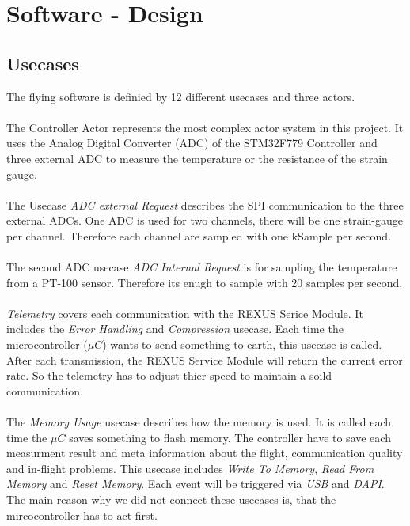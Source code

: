 \section{Software - Design}
\subsection{Usecases}
The flying software is definied by 12 different usecases and three actors. \\ \\
The Controller Actor represents the most complex actor system in this project. It uses the Analog Digital Converter (ADC) of the STM32F779 Controller and three external ADC to measure the temperature or the resistance of the strain gauge. \\ \\ 
The Usecase \textit{ADC external Request} describes the SPI communication to the three external ADCs. One ADC is used for two channels, there will be one strain-gauge per channel.  Therefore each channel are sampled with  one kSample per second. \\ \\
The second ADC usecase \textit{ADC Internal Request} is for sampling the temperature from a PT-100 sensor. Therefore its enugh to sample with 20 samples per second. \\ \\
\textit{Telemetry} covers each communication with the REXUS Serice Module. It includes the \textit{Error Handling} and \textit{Compression} usecase. Each time the microcontroller ($\mu C$) wants to send something to earth, this usecase is called. After each transmission, the REXUS Service Module will return the current error rate. So the telemetry has to adjust thier speed to maintain a soild communication. \\ \\
The \textit{Memory Usage} usecase describes how the memory is used. It is called each time the $\mu C$ saves something to flash memory. The controller have to save each measurment result and meta information about the flight, communication quality and in-flight problems. 
This usecase includes \textit{Write To Memory}, \textit{Read From Memory} and \textit{Reset Memory}. Each event will be triggered via \textit{USB} and \textit{DAPI}. The main reason why we did not connect these usecases is, that the mircocontroller has to act  first.  \\ \\ 
